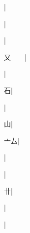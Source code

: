 \begin{multicols}{2}
{{\cjk{}{\cnsym{}　}{\cnsym{}　}{\cnsym{}　}}|{}\par
{\cjk{}{\cnsym{}　}{\cnsym{}　}{\cnsym{}　}}|{}\par
{}|{}\par
{\cjk{}又{\cnsym{}　}{\cnsym{}　}}|{}\par
{\cjk{}{\cnsym{}　}{\cnsym{}　}{\cnsym{}　}}|{}\par
{\cjk{}{\cnsym{}　}{\cnsym{}　}石}|{}\par
{}|{}\par
{\cjk{}{\cnsym{}　}{\cnsym{}　}山}|{}\par
{\cjk{}{\cnsym{}　}亠厶}|{}\par
{\cjk{}{\cnsym{}　}{\cnsym{}　}{\cnsym{}　}}|{}\par
{\cjk{}{\cnsym{}　}{\cnsym{}　}{\cnsym{}　}}|{}\par
{\cjk{}{\cnsym{}　}{\cnsym{}　}卄}|{}\par
{\cjk{}{\cnsym{}　}{\cnsym{}　}{\cnsym{}　}}|{}\par
{\cjk{}{\cnsym{}　}{\cnsym{}　}{\cnsym{}　}}|{}\par
}
\end{multicols}
